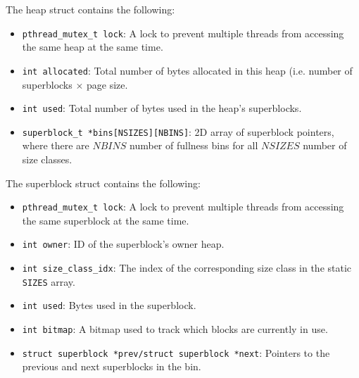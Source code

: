 \documentclass[11pt,twoside]{article}
\newcommand{\inlinecode}{\texttt}
\begin{document}
The heap struct contains the following:

\begin{itemize}
    \item
    \inlinecode{pthread\_mutex\_t lock}: A lock to prevent multiple threads from accessing the same heap at the same time.
    
    \item
    \inlinecode{int allocated}: Total number of bytes allocated in this heap (i.e. number of superblocks $\times$ page size.

    \item
    \inlinecode{int used}: Total number of bytes used in the heap's superblocks.
    
    \item
    \inlinecode{superblock\_t *bins[NSIZES][NBINS]}: 2D array of superblock pointers, where there are $NBINS$ number of fullness bins for all $NSIZES$ number of size classes.
\end{itemize}


The superblock struct contains the following:

\begin{itemize}
    \item
    \inlinecode{pthread\_mutex\_t lock}: A lock to prevent multiple threads from accessing the same superblock at the same time.

    \item
    \inlinecode{int owner}: ID of the superblock's owner heap.
    
    \item
    \inlinecode{int size\_class\_idx}: The index of the corresponding size class in the static \inlinecode{SIZES} array.
    
    \item
    \inlinecode{int used}: Bytes used in the superblock.
    
    \item
    \inlinecode{int bitmap}: A bitmap used to track which blocks are currently in use.
    
    \item
    \inlinecode{struct superblock *prev/struct superblock *next}: Pointers to the previous and next superblocks in the bin.
\end{itemize}
\end{document}
